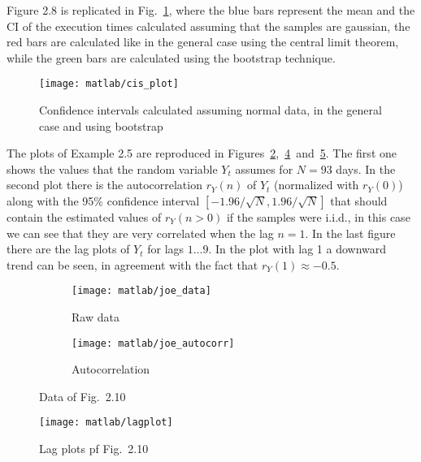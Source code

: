 \documentclass{article}
\begin{document}
    Figure 2.8 is replicated in Fig.~\ref{cis_plot}, where the blue
    bars represent the mean and the CI of the execution times
    calculated assuming that the samples are gaussian, the red bars
    are calculated like in the general case using the central limit
    theorem, while the green bars are calculated using the bootstrap
    technique.
    \begin{figure}[htbp]
    \centering
    \texttt{[image: matlab/cis\_plot]}
    \caption{Confidence intervals calculated assuming normal data, in
      the general case and using bootstrap}
    \label{cis_plot}
    \end{figure}
    
    The plots of Example 2.5 are reproduced in
    Figures~\ref{joe_data},~\ref{joe_autocorr}~and~\ref{joe_lagplot}. The
    first one shows the values that the random variable $Y_t$ assumes
    for $N = 93$ days. In the second plot there is the autocorrelation
    $r_Y(n)$ of $Y_t$ (normalized with $r_Y(0)$) along with the 95\%
    confidence interval $[-1.96/\sqrt{N}, 1.96/\sqrt{N}]$ that should
    contain the estimated values of $r_Y(n>0)$ if the samples were
    i.i.d., in this case we can see that they are very correlated when
    the lag $n=1$.  In the last figure there are the lag plots of
    $Y_t$ for lags $1\dots9$. In the plot with lag 1 a downward trend
    can be seen, in agreement with the fact that $r_Y(1) \approx
    -0.5$.
    \begin{figure}[htbp]
      \centering
      \begin{subfigure}{.5\textwidth}
        \centering
        \texttt{[image: matlab/joe\_data]}
        \caption{Raw data}
        \label{joe_data}
      \end{subfigure}%
      \begin{subfigure}{.5\textwidth}
        \centering
        \texttt{[image: matlab/joe\_autocorr]}
        \caption{Autocorrelation}
        \label{joe_autocorr}
      \end{subfigure}
      \caption{Data of Fig.~2.10}
    \end{figure}
    \begin{figure}[htbp]
      \centering
      \texttt{[image: matlab/lagplot]}
      \caption{Lag plots pf Fig.~2.10}
      \label{joe_lagplot}
    \end{figure}
    
\end{document}
